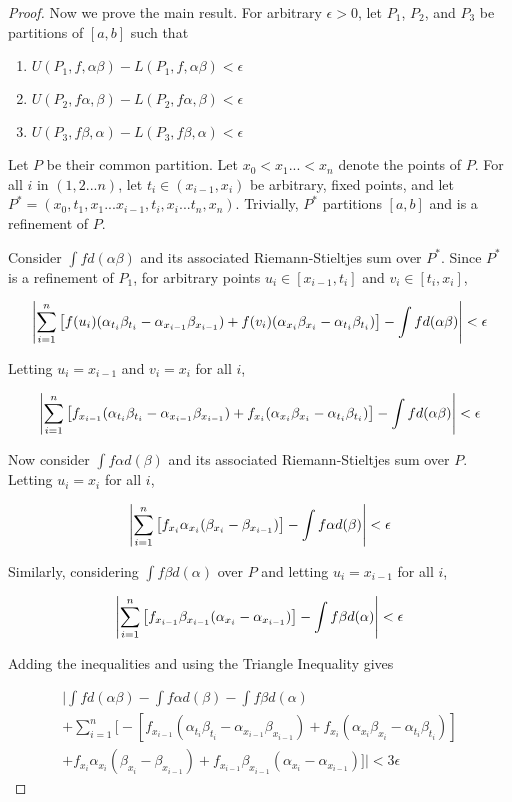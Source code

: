 \documentclass{amsart}
\DeclarePairedDelimiter{\abs}{\lvert}{\rvert}
\begin{document}
\begin{proof}
Now we prove the main result. For arbitrary $\epsilon > 0$, let $P_1$, $P_2$, and $P_3$ be partitions of $[a, b]$ such that

\begin{enumerate}
\item $U(P_1, f, \alpha\beta) - L(P_1, f, \alpha\beta) < \epsilon$
\item $U(P_2, f\alpha, \beta) - L(P_2, f\alpha, \beta) < \epsilon$
\item $U(P_3, f\beta, \alpha) - L(P_3, f\beta, \alpha) < \epsilon$
\end{enumerate}

Let $P$ be their common partition. Let $x_0 < x_1 ... < x_n$ denote the points of $P$. For all $i$ in $(1, 2...n)$, let $t_i \in (x_{i-1}, x_i)$ be arbitrary, fixed points, and let $P^* = (x_0, t_1, x_1 ... x_{i-1}, t_i, x_i ... t_n, x_n)$. Trivially, $P^*$ partitions $[a, b]$ and is a refinement of $P$.

Consider $\int f d(\alpha\beta)$ and its associated Riemann-Stieltjes sum over $P^*$. Since $P^*$ is a refinement of $P_1$, for arbitrary points $u_i \in [x_{i-1}, t_i]$ and $v_i \in [t_i, x_i]$,

\[
\abs*{ \sum_{i=1}^n \left[f(u_i)(\alpha_{t_i}\beta_{t_i} - \alpha_{x_{i-1}}\beta_{x_{i-1}})
+ f(v_i)(\alpha_{x_i}\beta_{x_i} - \alpha_{t_i}\beta_{t_i})\right]
- \int f d(\alpha\beta)}
< \epsilon
\]

Letting $u_i = x_{i-1}$ and $v_i = x_i$ for all $i$,

\[
\abs*{ \sum_{i=1}^n \left[f_{x_{i-1}}(\alpha_{t_i}\beta_{t_i} - \alpha_{x_{i-1}}\beta_{x_{i-1}})
+ f_{x_i}(\alpha_{x_i}\beta_{x_i} - \alpha_{t_i}\beta_{t_i})\right]
- \int f d(\alpha\beta)}
< \epsilon
\]

Now consider $\int f\alpha d(\beta)$ and its associated Riemann-Stieltjes sum over $P$. Letting $u_i = x_i$ for all $i$,

\[
\abs*{ \sum_{i=1}^n \left[f_{x_i}\alpha_{x_i}(\beta_{x_i} - \beta_{x_{i-1}})\right]
- \int f\alpha d(\beta)}
< \epsilon
\]

Similarly, considering $\int f\beta d(\alpha)$ over $P$ and letting $u_i = x_{i-1}$ for all $i$,

\[
\abs*{ \sum_{i=1}^n \left[f_{x_{i-1}}\beta_{x_{i-1}}(\alpha_{x_i} - \alpha_{x_{i-1}})\right]
- \int f\beta d(\alpha)}
< \epsilon
\]

Adding the inequalities and using the Triangle Inequality gives

\begin{gather*}
\bigg|
\int f d(\alpha\beta) - \int f\alpha d(\beta) - \int f\beta d(\alpha) \\
+ \sum_{i=1}^n \Big[
-\left[f_{x_{i-1}}(\alpha_{t_i}\beta_{t_i} - \alpha_{x_{i-1}}\beta_{x_{i-1}})
+ f_{x_i}(\alpha_{x_i}\beta_{x_i} - \alpha_{t_i}\beta_{t_i}) \right] \\
+ f_{x_i}\alpha_{x_i}(\beta_{x_i} - \beta_{x_{i-1}})
+ f_{x_{i-1}}\beta_{x_{i-1}}(\alpha_{x_i} - \alpha_{x_{i-1}})
\Big] \bigg|
< 3\epsilon
\end{gather*}


\end{proof}
\end{document}
